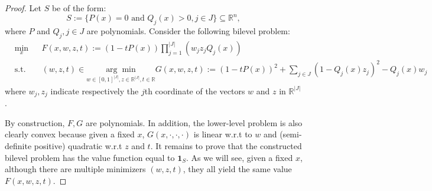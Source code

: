 \documentclass{article}
\newcommand{\mbf}[1]{\mathbf{#1}}
\newcommand*{\RR}{\mathbb{R}}
\newcommand{\argmin}{\arg\min}
\theoremstyle{plain}
\theoremstyle{definition}
\begin{document}
\begin{proof}
    Let $S$ be of the form:
    \begin{equation}
        \label{eq:basic-elementary-function-proof}
        S:= \{P(x) = 0 \text{ and } Q_j(x) > 0, j \in J\} \subseteq \RR^n,
    \end{equation}
    where $P$ and $Q_j, j \in J$ are polynomials. Consider the following bilevel problem:
    \begin{equation*}
        \begin{aligned}
        &\min_{x} && F(x, w, z, t):= (1 - tP(x))\prod_{j = 1}^{|J|} \left(w_jz_jQ_j(x)\right)\\
        &\text{s.t.} && (w,z,t) \in \underset{w \in [0,1]^{|J|}, z \in \RR^{|J|}, t \in \RR}{\argmin} G(x,w,z,t) := (1 - tP(x))^2 + \sum_{j \in J} (1 - Q_j(x)z_j)^2 - Q_j(x)w_j
    \end{aligned} 
    \end{equation*}
    where $w_j, z_j$ indicate respectively the $j$th coordinate of the vectors $w$ and $z$ in $\RR^{|J|}$. 
    
    By construction, $F, G$ are polynomials. In addition, the lower-level problem is also clearly convex because given a fixed $x$, $G(x,\cdot,\cdot,\cdot)$ is linear w.r.t to $w$ and (semi-definite positive) quadratic w.r.t $z$ and $t$. 
    It remains to prove that the constructed bilevel problem has the value function equal to $\mbf{1}_S$. As we will see, given a fixed $x$, although there are multiple minimizers $(w,z,t)$, they all yield the same value $F(x,w,z,t)$.
    

\end{proof}
\end{document}
